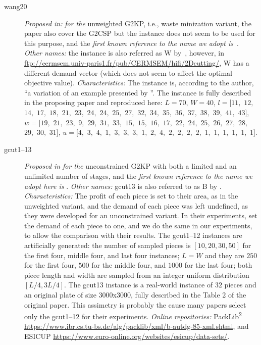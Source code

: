 \documentclass[ppgc,prop-tese,english,formais,babel]{iiufrgs}
\begin{document}
\begin{description}
\item [wang20] \emph{Proposed in:} \citet{wang:1983} \emph{for the} unweighted G2KP, i.e., waste minization variant, the paper also cover the G2CSP but the instance does not seem to be used for this purpose, and the \emph{first known reference to the name we adopt is}~\citet{fekete:1997}. \emph{Other names:} the instance is also referred as W by~\citet{fayard:1998}, however, in \url{ftp://cermsem.univ-paris1.fr/pub/CERMSEM/hifi/2Dcutting/}, W has a different demand vector (which does not seem to affect the optimal objective value). \emph{Characteristics:} The instance is, according to the author, ``a variation of an example presented by \citet{cw:1977}''. The instance is fully described in the proposing paper and reproduced here: \(L = 70\), \(W = 40\), \(l = [11,\) \(12,\) \(14,\) \(17,\) \(18,\) \(21,\) \(23,\) \(24,\) \(24,\) \(25,\) \(27,\) \(32,\) \(34,\) \(35,\) \(36,\) \(37,\) \(38,\) \(39,\) \(41,\) \(43]\), \(w = [19,\) \(21,\) \(23,\) \(9,\) \(29,\) \(31,\) \(33,\) \(15,\) \(15,\) \(16,\) \(17,\) \(22,\) \(24,\) \(25,\) \(26,\) \(27,\) \(28,\) \(29,\) \(30,\) \(31]\), \(u = [4,\) \(3,\) \(4,\) \(1,\) \(3,\) \(3,\) \(3,\) \(1,\) \(2,\) \(4,\) \(2,\) \(2,\) \(2,\) \(2,\) \(1,\) \(1,\) \(1,\) \(1,\) \(1,\) \(1]\).
\item [gcut1--13] \emph{Proposed in} \citet{beasley:1985:guillotine} \emph{for the} unconstrained G2KP with both a limited and an unlimited number of stages, and the \emph{first known reference to the name we adopt here is} \citet{martello:1998}. \emph{Other names:} gcut13 is also referred to as B by \citet{fekete:1997}. \emph{Characteristics: } The profit of each piece is set to their area, as in the unweighted variant, and the demand of each piece was left undefined, as they were developed for an unconstrained variant. In their experiments, \citet{furini:2016} set the demand of each piece to one, and we do the same in our experiments, to allow the comparison with their results. The gcut1--12 instances are artificially generated: the number of sampled pieces is \([10, 20, 30, 50]\) for the first four, middle four, and last four instances; \(L = W\) and they are \(250\) for the first four, \(500\) for the middle four, and \(1000\) for the last four; both piece length and width are sampled from an integer uniform distribution~\([L/4, 3L/4]\). The gcut13 instance is a real-world instance of \(32\) pieces and an original plate of size \(3000\)x\(3000\), fully described in the Table 2 of the original paper. This assimetry is probably the cause many papers select only the gcut1--12 for their experiments. \emph{Online repositories: } PackLib\textsuperscript{2} \url{https://www.ibr.cs.tu-bs.de/alg/packlib/xml/b-autdg-85-xml.shtml}, and ESICUP \url{https://www.euro-online.org/websites/esicup/data-sets/}.

\end{description}
\end{document}
